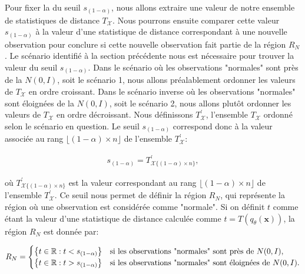 Pour fixer la \DIFdelbegin {}\DIFdelend \DIFaddbegin {}\DIFaddend du  seuil $s_{(1-\alpha)}$, nous allons extraire une valeur de notre ensemble de statistiques de distance $T_{\mathcal{X}}$. Nous pourrons ensuite comparer cette valeur $s_{(1-\alpha)}$ à la valeur d'une statistique de distance  correspondant à une nouvelle observation pour conclure si cette nouvelle observation fait partie de la région $R_N$. Le scénario identifié à la section précédente nous est nécessaire pour trouver la valeur du seuil $s_{(1-\alpha)}$. Dans le scénario où les observations "normales" sont près de la $N(0,I)$, soit le scénario 1, nous allons préalablement ordonner les valeurs de $T_{\mathcal{X}}$ en ordre croissant. Dans le scénario inverse où les observations "normales" sont éloignées de la $N(0,I)$, soit le scénario 2, nous allons plutôt ordonner les valeurs de $T_{\mathcal{X}}$ en ordre décroissant. Nous définissons $T^{'}_{\mathcal{X}}$, l'ensemble $T_{\mathcal{X}}$ ordonné selon le scénario en question. Le seuil $s_{(1-\alpha)}$ correspond donc à la valeur associée au rang $\lfloor(1 - \alpha) \times n\rfloor$ de l'ensemble $T^{'}_{\mathcal{X}}$:

\begin{gather} \label{eq:seuil}
s_{(1 - \alpha)} = T^{'}_{\mathcal{X} \{(1 - \alpha) \times n\}},
\end{gather}

où $T^{'}_{\mathcal{X} \{(1 - \alpha) \times n\}}$ est la valeur correspondant au rang $\lfloor(1 - \alpha) \times n\rfloor$ de l'ensemble $T^{'}_{\mathcal{X}}$. Ce seuil nous permet de définir la région $R_N$, qui représente la région où une observation est considérée comme "normale". Si on définit $t$ comme étant la valeur d'une statistique de distance calculée comme $t = T(q_\theta(\boldsymbol{x}))$, la région $R_N$ est donnée par:

\begin{gather} \label{eq:region}
	R_{N} = 
	\DIFdelbegin %
\DIFdelend \DIFaddbegin \begin{cases} 
		\big\{t \in \mathbb{R}: t < s_{(1 - \alpha)} \big\} & \text{si les observations "normales" sont près de $N(0, I)$}, \\
		\big\{t \in \mathbb{R}: t > s_{(1 - \alpha)} \big\} & \text{si les observations "normales" sont éloignées de $N(0, I)$}.
	\end{cases}
\DIFaddend \end{gather}


